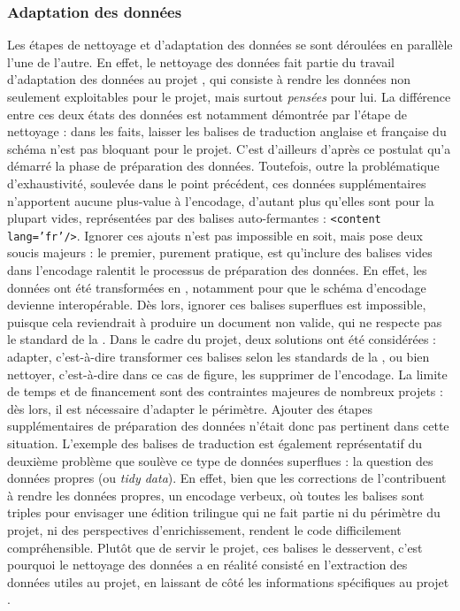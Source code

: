 \subsubsection{Adaptation des données}
Les étapes de nettoyage et d'adaptation des données se sont déroulées en parallèle l'une de l'autre. En effet, le nettoyage des données fait partie du travail d'adaptation des données au projet \COREL, qui consiste à rendre les données non seulement exploitables pour le projet, mais surtout \textit{pensées} pour lui. La différence entre ces deux états des données est notamment démontrée par l'étape de nettoyage : dans les faits, laisser les balises de traduction anglaise et française du schéma \LSC n'est pas bloquant pour le projet. C'est d'ailleurs d'après ce postulat qu'a démarré la phase de préparation des données. Toutefois, outre la problématique d'exhaustivité, soulevée dans le point précédent, ces données supplémentaires n'apportent aucune plus-value à l'encodage, d'autant plus qu'elles sont pour la plupart vides, représentées par des balises auto-fermantes : \texttt{<content lang='fr'/>}. Ignorer ces ajouts n'est pas impossible en soit, mais pose deux soucis majeurs : le premier, purement pratique, est qu'inclure des balises vides dans l'encodage \XML ralentit le processus de préparation des données. En effet, les données \XML ont été transformées en \TEI, notamment pour que le schéma d'encodage devienne interopérable. Dès lors, ignorer ces balises superflues est impossible, puisque cela reviendrait à produire un document non valide, qui ne respecte pas le standard de la \TEI. Dans le cadre du projet, deux solutions ont été considérées : adapter, c'est-à-dire transformer ces balises selon les standards de la \TEI, ou bien nettoyer, c'est-à-dire dans ce cas de figure, les supprimer de l'encodage. La limite de temps et de financement sont des contraintes majeures de nombreux projets : dès lors, il est nécessaire d'adapter le périmètre. Ajouter des étapes supplémentaires de préparation des données n'était donc pas pertinent dans cette situation. L'exemple des balises de traduction est également représentatif du deuxième problème que soulève ce type de données superflues : la question des données propres (ou \textit{tidy data}). En effet, bien que les corrections de l'\OCR contribuent à rendre les données propres, un encodage verbeux, où toutes les balises sont triples pour envisager une édition trilingue qui ne fait partie ni du périmètre du projet, ni des perspectives d'enrichissement, rendent le code difficilement compréhensible. Plutôt que de servir le projet, ces balises le desservent, c'est pourquoi le nettoyage des données a en réalité consisté en l'extraction des données utiles au projet, en laissant de côté les informations spécifiques au projet \LSC.  


